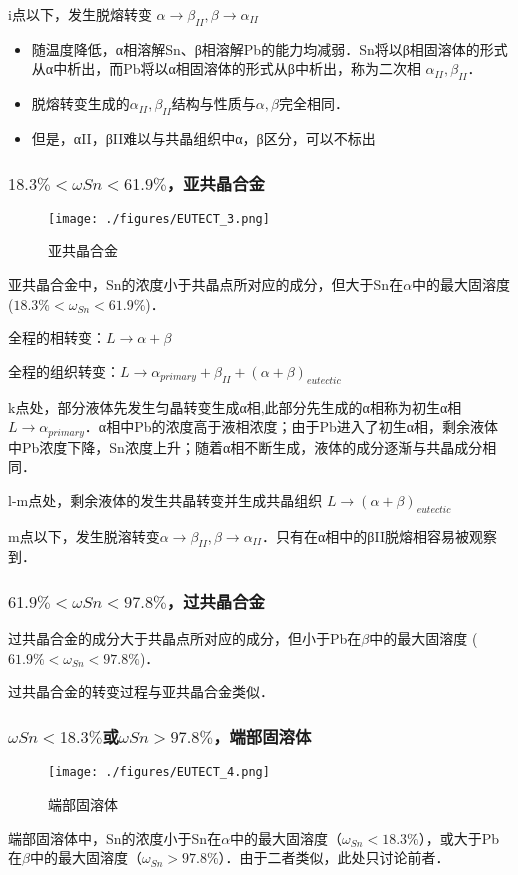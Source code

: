 i点以下，发生脱熔转变 $\alpha \rightarrow \beta_{II}, \beta \rightarrow \alpha_{II}$
\begin{itemize}
\item 随温度降低，α相溶解Sn、β相溶解Pb的能力均减弱．Sn将以β相固溶体的形式从α中析出，而Pb将以α相固溶体的形式从β中析出，称为二次相 $\alpha_{II},\beta_{II} $．
\item 脱熔转变生成的$\alpha_{II},\beta_{II} $结构与性质与$\alpha, \beta$完全相同．
\item 但是，αII，βII难以与共晶组织中α，β区分，可以不标出
\end{itemize}

\subsubsection{$18.3\%<\omega Sn<61.9\%$，亚共晶合金}
\begin{figure}[ht]
\centering
\texttt{[image: ./figures/EUTECT\_3.png]}
\caption{亚共晶合金} \label{EUTECT_fig3}
\end{figure}

亚共晶合金中，Sn的浓度小于共晶点所对应的成分，但大于Sn在$\alpha$中的最大固溶度 ($18.3\%<\omega_{Sn}<61.9\%$)．

全程的相转变：$L \rightarrow \alpha+\beta$

全程的组织转变：$L \rightarrow \alpha_{primary}+\beta_{II}+(\alpha+\beta)_{eutectic}$

k点处，部分液体先发生匀晶转变生成α相,此部分先生成的α相称为初生α相$L \rightarrow \alpha_{primary}$．α相中Pb的浓度高于液相浓度；由于Pb进入了初生α相，剩余液体中Pb浓度下降，Sn浓度上升；随着α相不断生成，液体的成分逐渐与共晶成分相同．

l-m点处，剩余液体的发生共晶转变并生成共晶组织 $L \rightarrow (\alpha+\beta)_{eutectic}$

m点以下，发生脱溶转变$\alpha \rightarrow \beta_{II}, \beta \rightarrow \alpha_{II}$．只有在α相中的βII脱熔相容易被观察到．

\subsubsection{$61.9\%<\omega Sn<97.8\%$，过共晶合金}
过共晶合金的成分大于共晶点所对应的成分，但小于Pb在$\beta$中的最大固溶度 ($61.9\%<\omega_{Sn}<97.8\%$)．

过共晶合金的转变过程与亚共晶合金类似．

\subsubsection{$\omega Sn<18.3\%$或$\omega Sn>97.8\%$，端部固溶体}
\begin{figure}[ht]
\centering
\texttt{[image: ./figures/EUTECT\_4.png]}
\caption{端部固溶体} \label{EUTECT_fig4}
\end{figure}
端部固溶体中，Sn的浓度小于Sn在$\alpha$中的最大固溶度（$\omega_{Sn}<18.3\%$），或大于Pb在$\beta$中的最大固溶度（$\omega_{Sn}>97.8\%$）．由于二者类似，此处只讨论前者．


